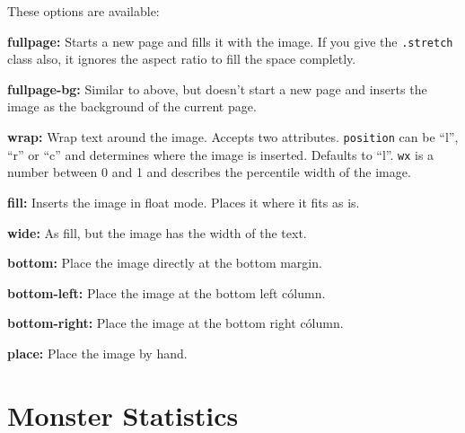 \documentclass[
  10pt,
  titlepage=firstiscover,
  toc=flat,
  twoside]{scrreprt}
\newlength{\sdBottom}
\newlength{\sdLeft}
\begin{document}
{\begin{multicols}{2}
These options are available:

\textbf{fullpage:} Starts a new page and fills it with the image. If you
give the \texttt{.stretch} class also, it ignores the aspect ratio to
fill the space completly.

\textbf{fullpage-bg:} Similar to above, but doesn't start a new page and
inserts the image as the background of the current page.

\textbf{wrap:} Wrap text around the image. Accepts two attributes.
\texttt{position} can be ``l'', ``r'' or ``c'' and determines where the
image is inserted. Defaults to ``l''. \texttt{wx} is a number between 0
and 1 and describes the percentile width of the image.

\textbf{fill:} Inserts the image in float mode. Places it where it fits
as is.

\textbf{wide:} As fill, but the image has the width of the text.

\textbf{bottom:} Place the image directly at the bottom margin.

\textbf{bottom-left:} Place the image at the bottom left cólumn.

\textbf{bottom-right:} Place the image at the bottom right cólumn.

\textbf{place:} Place the image by hand.


\end{multicols}
}

\chapter{Monster Statistics}\label{monster-statistics}
\end{document}
